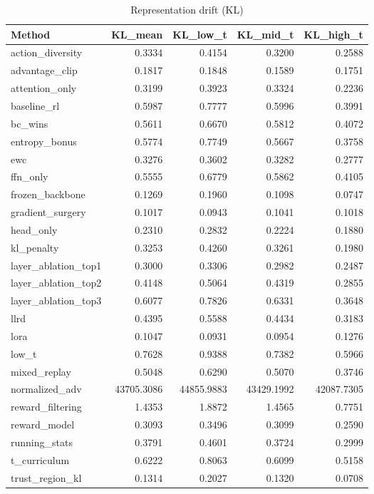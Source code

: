 \begin{table}[htbp]
\centering
\caption{Representation drift (KL)}
\label{tab:repr-drift}
\begin{tabular}{lrrrr}
\toprule
\textbf{Method} & \textbf{KL\_mean} & \textbf{KL\_low\_t} & \textbf{KL\_mid\_t} & \textbf{KL\_high\_t} \\
\midrule
action\_diversity & 0.3334 & 0.4154 & 0.3200 & 0.2588 \\
advantage\_clip & 0.1817 & 0.1848 & 0.1589 & 0.1751 \\
attention\_only & 0.3199 & 0.3923 & 0.3324 & 0.2236 \\
baseline\_rl & 0.5987 & 0.7777 & 0.5996 & 0.3991 \\
bc\_wins & 0.5611 & 0.6670 & 0.5812 & 0.4072 \\
entropy\_bonus & 0.5774 & 0.7749 & 0.5667 & 0.3758 \\
ewc & 0.3276 & 0.3602 & 0.3282 & 0.2777 \\
ffn\_only & 0.5555 & 0.6779 & 0.5862 & 0.4105 \\
frozen\_backbone & 0.1269 & 0.1960 & 0.1098 & 0.0747 \\
gradient\_surgery & 0.1017 & 0.0943 & 0.1041 & 0.1018 \\
head\_only & 0.2310 & 0.2832 & 0.2224 & 0.1880 \\
kl\_penalty & 0.3253 & 0.4260 & 0.3261 & 0.1980 \\
layer\_ablation\_top1 & 0.3000 & 0.3306 & 0.2982 & 0.2487 \\
layer\_ablation\_top2 & 0.4148 & 0.5064 & 0.4319 & 0.2855 \\
layer\_ablation\_top3 & 0.6077 & 0.7826 & 0.6331 & 0.3648 \\
llrd & 0.4395 & 0.5588 & 0.4434 & 0.3183 \\
lora & 0.1047 & 0.0931 & 0.0954 & 0.1276 \\
low\_t & 0.7628 & 0.9388 & 0.7382 & 0.5966 \\
mixed\_replay & 0.5048 & 0.6290 & 0.5070 & 0.3746 \\
normalized\_adv & 43705.3086 & 44855.9883 & 43429.1992 & 42087.7305 \\
reward\_filtering & 1.4353 & 1.8872 & 1.4565 & 0.7751 \\
reward\_model & 0.3093 & 0.3496 & 0.3099 & 0.2590 \\
running\_stats & 0.3791 & 0.4601 & 0.3724 & 0.2999 \\
t\_curriculum & 0.6222 & 0.8063 & 0.6099 & 0.5158 \\
trust\_region\_kl & 0.1314 & 0.2027 & 0.1320 & 0.0708 \\
\bottomrule
\end{tabular}
\end{table}